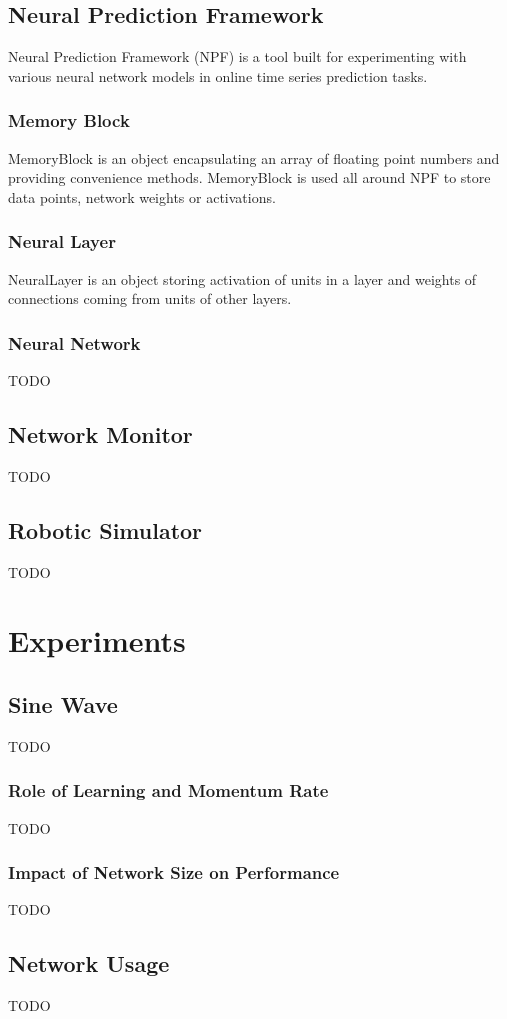 \documentclass[12pt,oneside]{fithesis2}
\begin{document}
\section{Neural Prediction Framework}
Neural Prediction Framework (NPF) is a tool built for experimenting with various neural network models in online time series prediction tasks.

\subsection{Memory Block}
MemoryBlock is an object encapsulating an array of floating point numbers and providing convenience methods. MemoryBlock is used all around NPF to store data points, network weights or activations.
\subsection{Neural Layer}
NeuralLayer is an object storing activation of units in a layer and weights of connections coming from units of other layers.
\subsection{Neural Network}
TODO
\section{Network Monitor}
TODO
\section{Robotic Simulator}
TODO

\chapter{Experiments}
\section{Sine Wave}
TODO
\subsection{Role of Learning and Momentum Rate}
TODO
\subsection{Impact of Network Size on Performance}
TODO

\section{Network Usage}
TODO
\end{document}
